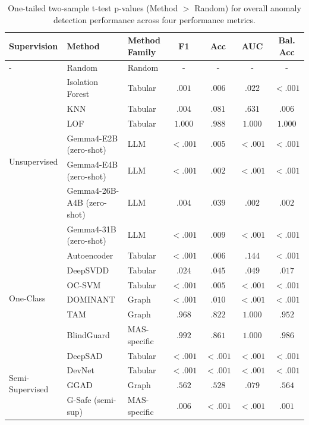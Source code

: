 \begin{table}[ht]
    \centering
    \small
    \setlength{\tabcolsep}{3pt}
    \caption{
        One-tailed two-sample t-test p-values (Method $>$ Random) for overall anomaly detection performance across four performance metrics.
    }
    \label{tab:main_results_pvalues_n5}
    \begin{tabular}{lllcccc}
\toprule
\textbf{Supervision} & \textbf{Method} & \textbf{Method Family} & \textbf{F1} & \textbf{Acc} & \textbf{AUC} & \textbf{Bal. Acc} \\
\midrule
\multirow{1}{*}{-} & Random & Random & - & - & - & -  \\
\midrule
\multirow{7}{*}{Unsupervised} 
& Isolation Forest & Tabular & $.001$ & $.006$ & $.022$ & $<.001$  \\
& KNN & Tabular & $.004$ & $.081$ & $.631$ & $.006$  \\
& LOF & Tabular & $1.000$ & $.988$ & $1.000$ & $1.000$  \\
& Gemma4-E2B (zero-shot) & LLM & $<.001$ & $.005$ & $<.001$ & $<.001$  \\
& Gemma4-E4B (zero-shot) & LLM & $<.001$ & $.002$ & $<.001$ & $<.001$  \\
& Gemma4-26B-A4B (zero-shot) & LLM & $.004$ & $.039$ & $.002$ & $.002$  \\
& Gemma4-31B (zero-shot) & LLM & $<.001$ & $.009$ & $<.001$ & $<.001$  \\
\midrule
\multirow{6}{*}{One-Class} 
& Autoencoder & Tabular & $<.001$ & $.006$ & $.144$ & $<.001$  \\
& DeepSVDD & Tabular & $.024$ & $.045$ & $.049$ & $.017$  \\
& OC-SVM & Tabular & $<.001$ & $.005$ & $<.001$ & $<.001$  \\
& DOMINANT & Graph & $<.001$ & $.010$ & $<.001$ & $<.001$  \\
& TAM & Graph & $.968$ & $.822$ & $1.000$ & $.952$  \\
& BlindGuard & MAS-specific & $.992$ & $.861$ & $1.000$ & $.986$  \\
\midrule
\multirow{8}{*}{Semi-Supervised} 
& DeepSAD & Tabular & $<.001$ & $<.001$ & $<.001$ & $<.001$  \\
& DevNet & Tabular & $<.001$ & $<.001$ & $<.001$ & $<.001$  \\
& GGAD & Graph & $.562$ & $.528$ & $.079$ & $.564$  \\
& G-Safe (semi-sup) & MAS-specific & $.006$ & $<.001$ & $<.001$ & $.001$  \\

\end{tabular}
\end{table}
